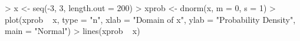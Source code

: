 \begin{Schunk}
\begin{Sinput}
> x <- seq(-3, 3, length.out = 200)
> xprob <- dnorm(x, m = 0, s = 1)
> plot(xprob ~ x, type = "n", xlab = "Domain of x", ylab = "Probability Density", main = "Normal")
> lines(xprob ~ x)
\end{Sinput}
\end{Schunk}
